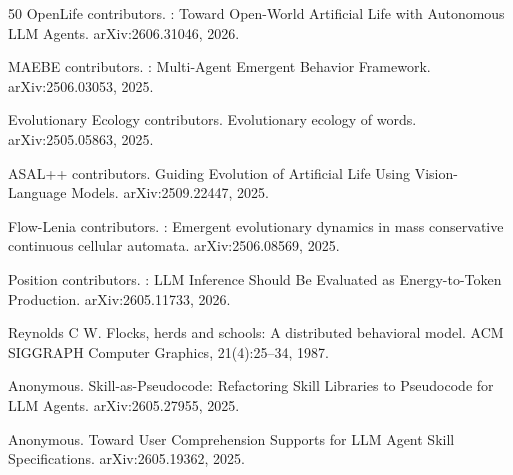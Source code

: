 \documentclass[twocolumn,10.5pt]{ctexart}
\begin{document}
\begin{thebibliography}{50}
OpenLife contributors.
: Toward Open-World Artificial Life with Autonomous LLM Agents.
\newblock arXiv:2606.31046, 2026.

MAEBE contributors.
: Multi-Agent Emergent Behavior Framework.
\newblock arXiv:2506.03053, 2025.

Evolutionary Ecology contributors.
\newblock Evolutionary ecology of words.
\newblock arXiv:2505.05863, 2025.

ASAL++ contributors.
\newblock Guiding Evolution of Artificial Life Using Vision-Language Models.
\newblock arXiv:2509.22447, 2025.

Flow-Lenia contributors.
: Emergent evolutionary dynamics in mass conservative continuous cellular automata.
\newblock arXiv:2506.08569, 2025.

{Position} contributors.
: LLM Inference Should Be Evaluated as Energy-to-Token Production.
\newblock arXiv:2605.11733, 2026.

Reynolds C W.
\newblock Flocks, herds and schools: A distributed behavioral model.
\newblock ACM SIGGRAPH Computer Graphics, 21(4):25--34, 1987.

Anonymous.
\newblock Skill-as-Pseudocode: Refactoring Skill Libraries to Pseudocode for {LLM} Agents.
\newblock arXiv:2605.27955, 2025.

Anonymous.
\newblock Toward User Comprehension Supports for {LLM} Agent Skill Specifications.
\newblock arXiv:2605.19362, 2025.

\end{thebibliography}
\end{document}
